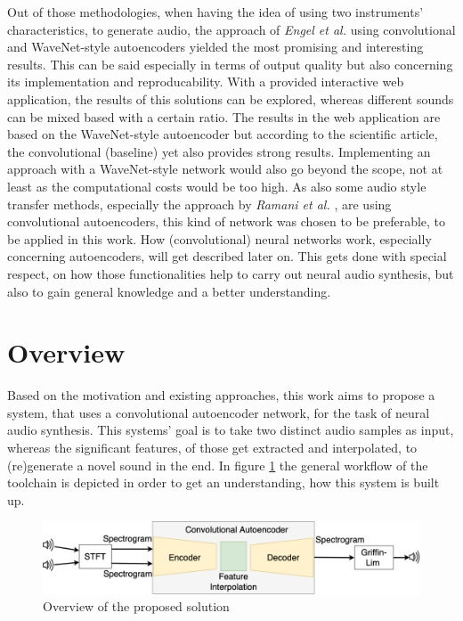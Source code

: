 Out of those methodologies, when having the idea of using two instruments' characteristics, to generate audio, the approach of \textit{Engel et al.} \cite{Engel2017} using convolutional and WaveNet-style autoencoders yielded the most promising and interesting results. This can be said especially in terms of output quality but also concerning its implementation and reproducability. With a provided interactive web application, the results of this solutions can be explored, whereas different sounds can be mixed based with a certain ratio. The results in the web application are based on the WaveNet-style autoencoder but according to the scientific article, the convolutional (baseline) yet also provides strong results. Implementing an approach with a WaveNet-style network would also go beyond the scope, not at least as the computational costs would be too high. As also some audio style transfer methods, especially the approach by \textit{Ramani et al.} \cite{Ramani2018}, are using convolutional autoencoders, this kind of network was chosen to be preferable, to be applied in this work. How (convolutional) neural networks work, especially concerning autoencoders, will get described later on. This gets done with special respect, on how those functionalities help to carry out neural audio synthesis, but also to gain general knowledge and a better understanding.

\section{Overview}
\label{sec:app_overview}
Based on the motivation and existing approaches, this work aims to propose a system, that uses a convolutional autoencoder network, for the task of neural audio synthesis. This systems' goal is to take two distinct audio samples as input, whereas the significant features, of those get extracted and interpolated, to (re)generate a novel sound in the end. In figure \ref{fig:toolchain} the general workflow of the toolchain is depicted in order to get an understanding, how this system is built up. 

 \begin{figure}[htb!]
	\caption{Overview of the proposed solution}
	\label{fig:toolchain}
	\centering
	\includegraphics[width=\textwidth]{images/approach/Toolchain.png}
\end{figure}

